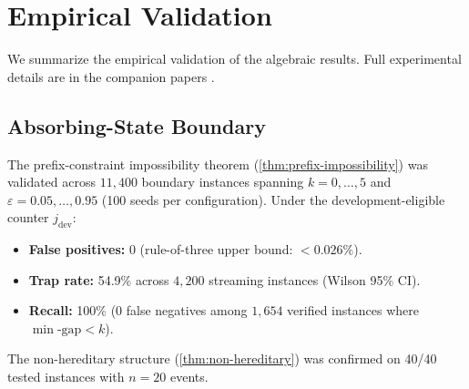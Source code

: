 \documentclass[11pt]{article}
\theoremstyle{plain}
\theoremstyle{definition}
\theoremstyle{remark}
\newcommand{\jdev}{{j_{\mathrm{dev}}}}
\begin{document}
\section{Empirical Validation}\label{sec:empirical}

We summarize the empirical validation of the algebraic results.  Full
experimental details are in the companion papers
\cite{gaffney2026absorbing,gaffney2026streaming,gaffney2026mirage}.

\subsection{Absorbing-State Boundary}

The prefix-constraint impossibility theorem
(\cref{thm:prefix-impossibility}) was validated across $11{,}400$
boundary instances spanning $k = 0, \ldots, 5$ and $\varepsilon = 0.05,
\ldots, 0.95$ (100 seeds per configuration).  Under the
development-eligible counter $\jdev$:
\begin{itemize}[nosep]
  \item \textbf{False positives:} 0 (rule-of-three upper bound:
    $< 0.026\%$).
  \item \textbf{Trap rate:} 54.9\% across $4{,}200$ streaming instances
    (Wilson 95\% CI).
  \item \textbf{Recall:} 100\% ($0$ false negatives among $1{,}654$
    verified instances where $\min\text{-gap} < k$).
\end{itemize}
The non-hereditary structure (\cref{thm:non-hereditary}) was confirmed
on 40/40 tested instances with $n = 20$ events.
\end{document}
